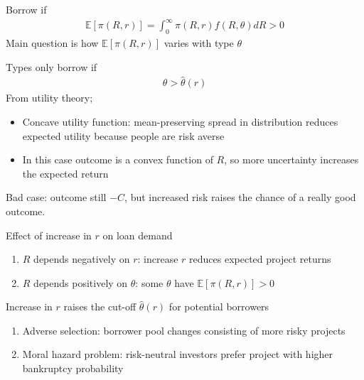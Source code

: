 \documentclass{beamer}
\begin{document}
\begin{frame}
Borrow if
\begin{align}
  \mathbb{E}[\pi(R,r)]=\int_0^{\infty} \pi(R,r)f(R,\theta)dR>0
\end{align}
\medskip
Main question is how $\mathbb{E}[\pi(R,r)]$ varies with type $\theta$
\end{frame}

\begin{frame}
Types only borrow if 
\begin{align}
  \theta > \hat{\theta}(r)
\end{align}
\medskip
From utility theory;
\begin{itemize}
  \item Concave utility function: mean-preserving spread in distribution reduces expected utility because people are risk averse
  \item In this case outcome is a convex function of $R$, so more uncertainty increases the expected return
\end{itemize}
\medskip
Bad case: outcome still $-C$, but increased risk raises the chance of a really good outcome. 
\end{frame}

\begin{frame}
 Effect of increase in $r$ on loan demand
 \begin{enumerate}
   \item $R$ depends negatively on $r$: increase $r$ reduces expected project returns  
   \item $R$ depends positively on $\theta$: some $\theta$ have $\mathbb{E}[\pi(R,r)]>0$     
 \end{enumerate}
 \medskip
  Increase in $r$ raises the cut-off $\hat{\theta}(r)$ for potential borrowers
 \begin{enumerate}
   \item Adverse selection: borrower pool changes consisting of more risky projects 
   \item Moral hazard problem: risk-neutral investors prefer project with higher bankruptcy probability
 \end{enumerate}
\end{frame}
\end{document}
